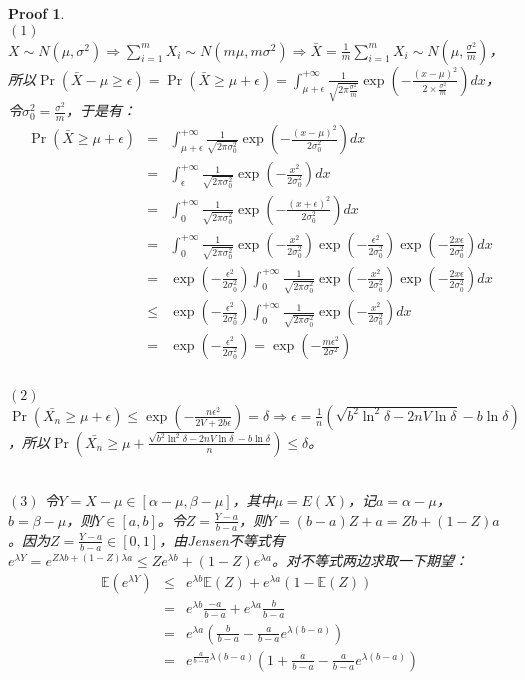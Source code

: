 \documentclass[a4paper,UTF8]{article}
\numberwithin{equation}{section}
\newtheorem*{myProof}{Proof}
\begin{document}
\begin{myProof}
~\\
$(1)$ $X \sim N(\mu, \sigma^2) \Longrightarrow \sum_{i=1}^m X_i \sim N(m\mu, m\sigma^2) \Longrightarrow \bar{X} = \frac{1}{m} \sum_{i=1}^m X_i \sim N(\mu, \frac{\sigma^2}{m})$，所以$\Pr(\bar{X} - \mu \ge \epsilon) = \Pr (\bar{X} \ge \mu + \epsilon) = \int_{\mu + \epsilon}^{+\infty} \frac{1}{\sqrt{2\pi \frac{\sigma^2}{m}}} \exp(- \frac{(x-\mu)^2}{2\times\frac{\sigma^2}{m}}) dx$，令$\sigma_0^2 = \frac{\sigma^2}{m}$，于是有：
\begin{eqnarray*}
\Pr (\bar{X} \ge \mu + \epsilon) &=& \int_{\mu + \epsilon}^{+\infty} \frac{1}{\sqrt{2\pi \sigma_0^2}} \exp(- \frac{(x-\mu)^2}{2\sigma_0^2}) dx \\
&=& \int_{\epsilon}^{+\infty} \frac{1}{\sqrt{2\pi \sigma_0^2}} \exp(- \frac{x^2}{2\sigma_0^2}) dx \\
&=& \int_{0}^{+\infty} \frac{1}{\sqrt{2\pi \sigma_0^2}} \exp(- \frac{(x + \epsilon)^2}{2\sigma_0^2}) dx \\
&=& \int_{0}^{+\infty} \frac{1}{\sqrt{2\pi \sigma_0^2}} \exp(- \frac{x^2}{2\sigma_0^2}) \exp(- \frac{\epsilon^2}{2\sigma_0^2}) \exp(- \frac{2x\epsilon}{2\sigma_0^2}) dx \\
&=& \exp(- \frac{\epsilon^2}{2\sigma_0^2}) \int_{0}^{+\infty} \frac{1}{\sqrt{2\pi \sigma_0^2}} \exp(- \frac{x^2}{2\sigma_0^2})  \exp(- \frac{2x\epsilon}{2\sigma_0^2}) dx \\
&\le& \exp(- \frac{\epsilon^2}{2\sigma_0^2}) \int_{0}^{+\infty} \frac{1}{\sqrt{2\pi \sigma_0^2}} \exp(- \frac{x^2}{2\sigma_0^2}) dx \\
&=& \exp(- \frac{\epsilon^2}{2\sigma_0^2}) = \exp(- \frac{m\epsilon^2}{2\sigma^2}) \\
\end{eqnarray*}
~\\
$(2)$ $\Pr(\bar{X_n} \ge \mu + \epsilon) \le \exp(- \frac{n \epsilon^2}{2V + 2b\epsilon}) = \delta  \Longrightarrow \epsilon = \frac{1}{n}(\sqrt{b^2\ln^2\delta - 2nV\ln\delta} - b \ln\delta)$，所以$\Pr(\bar{X_n} \ge \mu + \frac{\sqrt{b^2\ln^2\delta - 2nV\ln\delta} - b \ln \delta}{n}) \le \delta$。

~\\
$(3)$ 令$Y = X - \mu \in [\alpha - \mu, \beta - \mu]$，其中$\mu = E(X)$，记$a = \alpha - \mu$， $b = \beta - \mu$，则$Y \in [a, b]$。令$Z = \frac{Y-a}{b-a}$，则$Y = (b-a)Z + a = Zb + (1 - Z)a$。因为$Z = \frac{Y-a}{b-a} \in [0, 1]$，由Jensen不等式有$e^{\lambda Y} = e^{Z \lambda b + (1-Z) \lambda a} \le Z e^{\lambda b} + (1-Z)e^{\lambda a}$。对不等式两边求取一下期望：
\begin{eqnarray*}
\mathbb{E}(e^{\lambda Y}) &\le& e^{\lambda b} \mathbb{E}(Z) + e^{\lambda a} (1 - \mathbb{E}(Z)) \\
&=& e^{\lambda b} \frac{-a}{b - a} + e ^ {\lambda a}\frac{b}{b - a} \\
&=& e ^ {\lambda a} \left(\frac{b}{b - a} - \frac{a}{b - a}e^{\lambda (b - a)} \right) \\
&=& e ^ {\frac{a}{b - a} \lambda (b - a)} \left(1 + \frac{a}{b - a} - \frac{a}{b - a}e^{\lambda (b - a)} \right) \\
\end{eqnarray*}


\end{myProof}
\end{document}
